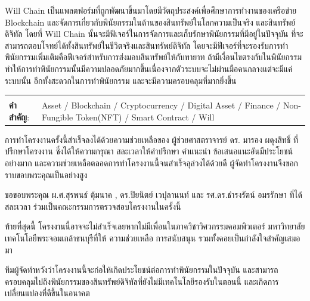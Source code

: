 \documentclass[12pt,oneside,openright,a4paper]{cpe-thai-project}
\begin{document}
\tab Will Chain เป็นแพลตฟอร์มที่ถูกพัฒนาขึ้นมาโดยมีวัตถุประสงค์เพื่อศึกษาการทำงานของเครือข่าย Blockchain  และจัดการเกี่ยวกับพินัยกรรมในด้านของสินทรัพย์ในโลกความเป็นจริง และสินทรัพย์ดิจิทัล โดยที่ Will Chain นั้นจะมีฟีเจอร์ในการจัดการและเก็บรักษาพินัยกรรมที่มีอยู่ในปัจจุบัน ที่จะสามารถตอบโจทย์ได้ทั้งสินทรัพย์ในชีวิตจริงและสินทรัพย์ดิจิทัล โดยจะมีฟีเจอร์ที่จะรองรับการทำพินัยกรรมเพิ่มเติมคือฟีเจอร์สำหรับการส่งมอบสินทรัพย์ให้กับทายาท ถ้ามีเงื่อนไขตรงกับในพินัยกรรม ทำให้การทำพินัยกรรมนั้นมีความปลอดภัยมากขึ้นเนื่องจากตัวระบบจะไม่ผ่านมือคนกลางแต่จะมีแค่ระบบนั้น อีกทั้งสะดวกในการทำพินัยกรรม และจะมีความครอบคลุมที่มากยิ่งขึ้น
\begin{flushleft}
\begin{tabular*}{\textwidth}{@{}lp{}}
 & \\

\textbf{คำสำคัญ}: & Asset / Blockchain / Cryptocurrency / Digital Asset / Finance / Non-Fungible Token(NFT) /  Smart Contract / Will 
\end{tabular*}
\end{flushleft}
\endabstract


\preface
\tab การทําโครงงานครั้งนี้สําเร็จลงได้ด้วยความช่วยเหลือของ ผู้ช่วยศาสตราจารย์ ดร. มารอง ผดุงสิทธิ์ ที่ปรึกษาโครงงาน ซึ่งได้ให้ความกรุณา สละเวลาให้คําปรึกษา คําแนะนํา ข้อเสนอแนะอันมีประโยชน์อย่างมาก และความช่วยเหลือตลอดการทําโครงงานนี้จนสําเร็จลุล่วงได้ด้วยดี ผู้จัดทําโครงงานจึงขอกราบขอบพระคุณเป็นอย่างสูง

\tab ขอขอบพระคุณ ผ.ศ.สุรพนธ์ ตุ้มนาค , ดร.ปิยนิตย์ เวปุลานนท์ และ รศ.ดร.ธํารงรัตน์ อมรรักษา ที่ได้สละเวลา
ร่วมเป็นคณะกรรมการตรวจสอบโครงงานในครั้งนี้ 

\tab ท้ายที่สุดนี้ โครงงานนี้อาจจะไม่สําเร็จเลยหากไม่มีเพื่อนในภาควิชาวิศวกรรมคอมพิวเตอร์ มหาวิทยาลัยเทคโนโลยีพระจอมเกล้าธนบุรีที่ให้ 
ความช่วยเหลือ การสนับสนุน รวมทั้งคอยเป็นกําลังใจสําคัญเสมอมา 

\tab ทีมผู้จัดทำหวังว่าโครงงานนี้จะก่อให้เกิดประโยชน์ต่อการทำพินัยกรรมในปัจจุบัน และสามารถครอบคลุมไปถึงพินัยกรรมของสินทรัพย์ดิจิทัลที่ยังไม่มีเทคโนโลยีรองรับในตอนนี้ และเกิดการเปลี่ยนแปลงที่ดีขึ้นในอนาคต

\tableofcontents                    
\listoftables
\listoffigures                      
\end{document}
